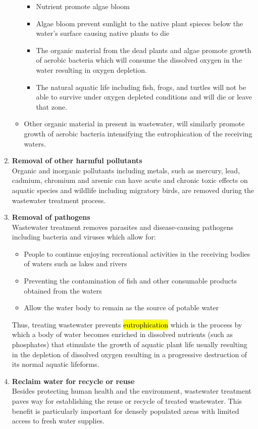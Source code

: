 \documentclass{article}
\begin{document}
\begin{enumerate}
\begin{itemize}
\begin{itemize}
\item Nutrient promote algae bloom
\item Algae bloom prevent sunlight to the native plant spieces below the water's surface causing native plants to die
\item The organic material from the dead plants and algae promote growth of aerobic bacteria which will consume the dissolved oxygen in the water resulting in oxygen depletion.
\item The natural aquatic life including fish, frogs, and turtles will not be able to survive under oxygen depleted conditions and will die or leave that zone.
\end{itemize}
\item Other organic material in present in wastewater, will similarly promote growth of aerobic bacteria intensifying the eutrophication of the receiving waters.
\end{itemize}
\item \textbf{Removal of other harmful pollutants}\\
Organic and inorganic pollutants including metals, such as mercury, lead, cadmium, chromium and arsenic can have acute and chronic toxic effects on aquatic species and wildlife including migratory birds, are removed during the wastewater treatment process.
\item \textbf{Removal of pathogens}\\
Wastewater treatment removes parasites and disease-causing pathogens including bacteria and viruses which allow for:
\begin{itemize}
\item People to continue enjoying recreational activities in the receiving bodies of waters such as lakes and rivers
\item Preventing the contamination of fish and other consumable products obtained from the waters
\item Allow the water body to remain as the source of potable water
\end{itemize}
Thus, treating wastewater prevents \hl{eutrophication} which is the process by which a body of water becomes enriched in dissolved nutrients (such as phosphates) that stimulate the growth of aquatic plant life usually resulting in the depletion of dissolved oxygen resulting in a progressive destruction of its normal aquatic lifeforms.
\item \textbf{Reclaim water for recycle or reuse}\\
Besides protecting human health and the environment, wastewater treatment paves way for establishing the reuse or recycle of treated wastewater.  This benefit is particularly important for densely populated areas with limited access to fresh water supplies.  
\end{enumerate}
\end{document}
